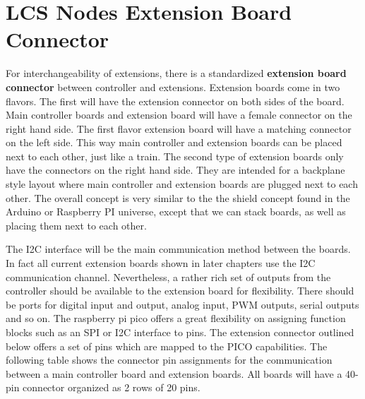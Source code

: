 \section{LCS Nodes Extension Board Connector}

For interchangeability of extensions, there is a standardized \textbf{extension board connector} between controller and extensions. Extension boards come in two flavors. The first will have the extension connector on both sides of the board. Main controller boards and extension board will have a female connector on the right hand side. The first flavor extension board will have a matching connector on the left side. This way main controller and extension boards can be placed next to each other, just like a train. The second type of extension boards only have the connectors on the right hand side. They are intended for a backplane style layout where main controller and extension boards are plugged next to each other. The overall concept is very similar to the the shield concept found in the Arduino or Raspberry PI universe, except that we can stack boards, as well as placing them next to each other. 

The I2C interface will be the main communication method between the boards. In fact all current extension boards shown in later chapters use the I2C communication channel. Nevertheless, a rather rich set of outputs from the controller should be available to the extension board for flexibility. There should be ports for digital input and output, analog input, PWM outputs, serial outputs and so on. The raspberry pi pico offers a great flexibility on assigning function blocks such as an SPI or I2C interface to pins. The extension connector outlined below offers a set of pins which are mapped to the PICO capabilities. The following table shows the connector pin assignments for the communication between a main controller board and extension boards. All boards will have a 40-pin connector organized as 2 rows of 20 pins.

